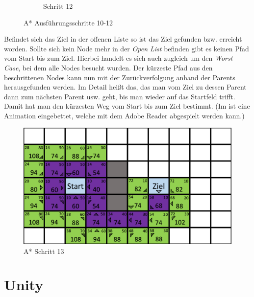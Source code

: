 \begin{figure}[H]
\begin{subfigure}[b]{0.3\textwidth}
        \caption{Schritt 12}
        \label{fig:aStartStep12}
    \end{subfigure}
    \caption{A* Ausführungsschritte 10-12}\label{fig:aStarStep10_12}
\end{figure}

Befindet sich das Ziel in der offenen Liste so ist das Ziel gefunden bzw. erreicht worden. Sollte sich kein Node mehr in der \textit{Open List} befinden gibt es keinen Pfad vom Start bis zum Ziel. Hierbei handelt es sich auch zugleich um den \textit{Worst Case}, bei dem alle Nodes besucht wurden.
Der kürzeste Pfad aus den beschrittenen Nodes kann nun mit der Zurückverfolgung anhand der Parents herausgefunden werden. Im Detail hei\ss t das, das man vom Ziel zu dessen Parent dann zum nächsten Parent usw. geht, bis man wieder auf das Startfeld trifft. Damit hat man den kürzesten Weg vom Start bis zum Ziel bestimmt. (Im  ist eine Animation eingebettet, welche mit dem Adobe Reader abgespielt werden kann.)  
\begin{figure}[H]
    \centering
    \includegraphics[width=\textwidth]{assets/aStarStep13.png}
    \caption{A* Schritt 13}\label{fig:aStarStep13}
\end{figure}
\section{Unity}

